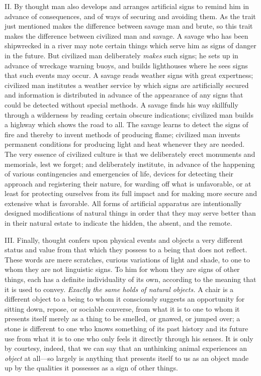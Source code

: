 \documentclass[letterpaper]{book}
\begin{document}
II. By thought man also develops and arranges artificial signs to remind
him in advance of consequences, and of ways of securing and avoiding
them. As the trait just mentioned makes the difference between savage
man and brute, so this trait makes the difference between civilized man
and savage. A savage who has been shipwrecked in a river may note
certain things
which
serve him as signs of danger in the future. But civilized man
deliberately \emph{makes} such signs; he sets up in advance of wreckage
warning buoys, and builds lighthouses where he sees signs that such
events may occur. A savage reads weather signs with great expertness;
civilized man institutes a weather service by which signs are
artificially secured and information is distributed in advance of the
appearance of any signs that could be detected without special methods.
A savage finds his way skillfully through a wilderness by reading
certain obscure indications; civilized man builds a highway which shows
the road to all. The savage learns to detect the signs of fire and
thereby to invent methods of producing flame; civilized man invents
permanent conditions for producing light and heat whenever they are
needed. The very essence of civilized culture is that we deliberately
erect monuments and memorials, lest we forget; and deliberately
institute, in advance of the happening of various contingencies and
emergencies of life, devices for detecting their approach and
registering their nature, for warding off what is unfavorable, or at
least for protecting ourselves from its full impact and for making more
secure and extensive what is favorable. All forms of artificial
apparatus are intentionally designed modifications of natural things in
order that they may serve better than in their natural estate to
indicate the hidden, the absent, and the remote.


III. Finally, thought confers upon physical events and objects a very
different status and value from that which they possess to a being that
does not reflect. These words are mere scratches, curious variations of
light and shade, to one to whom they are not linguistic signs. To him
for whom they are signs of other
things,
each has a definite individuality of its own, according to the meaning
that it is used to convey. \emph{Exactly the same holds of natural
objects.} A chair is a different object to a being to whom it
consciously suggests an opportunity for sitting down, repose, or
sociable converse, from what it is to one to whom it presents itself
merely as a thing to be smelled, or gnawed, or jumped over; a stone is
different to one who knows something of its past history and its future
use from what it is to one who only feels it directly through his
senses. It is only by courtesy, indeed, that we can say that an
unthinking animal experiences an \emph{object} at all---so largely is
anything that presents itself to us as an object made up by the
qualities it possesses as a sign of other things.
\end{document}
